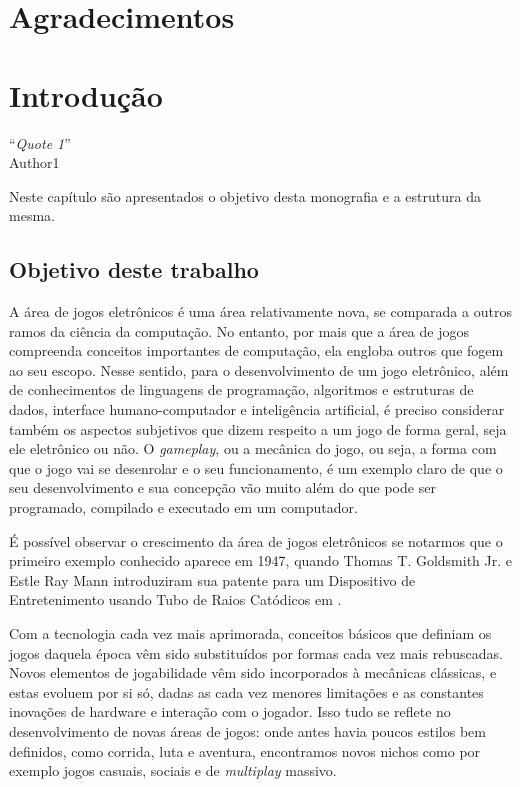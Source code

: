 \documentclass[brazil]{abnt}
\begin{document}
\chapter*{Agradecimentos}

\tableofcontents{}
\listoffigures

\chapter{Introdução\label{cap:introducao}}

\vfill{}
\begin{flushright}{}``\emph{Quote 1}''\\
{\small Author1}\end{flushright}{\small \par}
\vfill{}

Neste capítulo são apresentados o objetivo desta monografia e a estrutura da mesma.
\newpage


\section{Objetivo deste trabalho}

A área de jogos eletrônicos é uma área relativamente nova, se comparada a outros ramos da ciência da computação. No entanto, por mais que a área de jogos compreenda conceitos importantes de computação, ela engloba outros que fogem ao seu escopo. Nesse sentido, para o desenvolvimento de um jogo eletrônico, além de conhecimentos de linguagens de programação, algoritmos e estruturas de dados, interface humano-computador e inteligência artificial, é preciso considerar também os aspectos subjetivos que dizem respeito a um jogo de forma geral, seja ele eletrônico ou não. O \textit{gameplay}, ou a mecânica do jogo, ou seja, a forma com que o jogo vai se desenrolar e o seu funcionamento, é um exemplo claro de que o seu desenvolvimento e sua concepção vão muito além do que pode ser programado, compilado e executado em um computador.

É possível observar o crescimento da área de jogos eletrônicos se notarmos que o primeiro exemplo conhecido aparece em 1947, quando Thomas T. Goldsmith Jr. e Estle Ray Mann introduziram sua patente para um Dispositivo de Entretenimento usando Tubo de Raios Catódicos em \cite{2455992}. 

Com a tecnologia cada vez mais aprimorada, conceitos básicos que definiam os jogos daquela época vêm sido substituídos por formas cada vez mais rebuscadas. Novos elementos de jogabilidade vêm sido incorporados à mecânicas clássicas, e estas evoluem por si só, dadas as cada vez menores limitações e as constantes inovações de hardware e interação com o jogador. Isso tudo se reflete no desenvolvimento de novas áreas de jogos: onde antes havia poucos estilos bem definidos, como corrida, luta e aventura, encontramos novos nichos como por exemplo jogos casuais, sociais e de \textit{multiplay} massivo.
\end{document}
